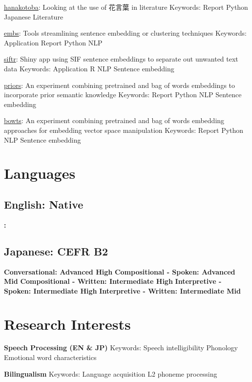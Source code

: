 \documentclass[letterpaper]{deedy-resume_sm}
\begin{document}
\href{https://github.com/ryancahildebrandt/hanakotoba}{hanakotoba}: Looking at the use of 花言葉 in literature 
Keywords: Report \textbullet{} Python \textbullet{} Japanese \textbullet{} Literature

\href{https://github.com/ryancahildebrandt/embs}{embs}: Tools streamlining sentence embedding or clustering techniques
Keywords: Application \textbullet{} Report \textbullet{} Python \textbullet{} NLP

\href{https://github.com/ryancahildebrandt/siftr}{siftr}: Shiny app using SIF sentence embeddings to separate out unwanted text data
Keywords: Application \textbullet{} R \textbullet{} NLP \textbullet{} Sentence embedding

\href{https://github.com/ryancahildebrandt/priors}{priors}: An experiment combining pretrained and bag of words embeddings to incorporate prior semantic knowledge
Keywords: Report \textbullet{} Python \textbullet{} NLP \textbullet{} Sentence embedding

\href{https://github.com/ryancahildebrandt/bowts}{bowts}: An experiment combining pretrained and bag of words embedding approaches for embedding vector space manipulation
Keywords: Report \textbullet{} Python \textbullet{} NLP \textbullet{} Sentence embedding

\section{Languages}
\subsection{English: Native}
\textbf{: }

\subsection{Japanese: CEFR B2}
\textbf{Conversational: Advanced High}
\textbf{Compositional - Spoken: Advanced Mid}
\textbf{Compositional - Written: Intermediate High}
\textbf{Interpretive - Spoken: Intermediate High}
\textbf{Interpretive - Written: Intermediate Mid}

\section{Research Interests}
\textbf{Speech Processing (EN \& JP)}
Keywords: Speech intelligibility \textbullet{} Phonology \textbullet{} Emotional word characteristics

\textbf{Bilingualism}
Keywords: Language acquisition \textbullet{} L2 phoneme processing
\end{document}
